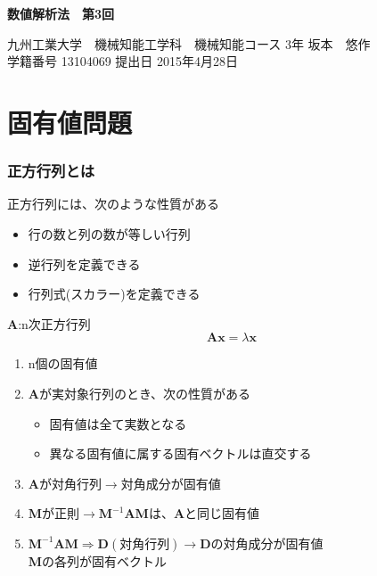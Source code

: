 \documentclass[a4j,twoside,openright,11pt]{jsarticle}
\begin{document}
\begin{screen}
\huge
\begin{center}
{\bf 数値解析法　第3回}\\
\end{center}

\normalsize
\begin{flushright}
九州工業大学　機械知能工学科　機械知能コース 3年 坂本　悠作\\学籍番号 13104069 \hspace{0.2in}提出日 2015年4月28日
\end{flushright}
\end{screen}


\setcounter{section}{2}
\section{固有値問題}
\subsubsection{正方行列とは}
正方行列には、次のような性質がある
\begin{itemize}
\item 行の数と列の数が等しい行列
\item 逆行列を定義できる
\item 行列式(スカラー)を定義できる
\end{itemize}

$\bm{A}$:n次正方行列
\begin{equation}
\bm{A}\bm{x}=\lambda\bm{x}
\end{equation}

\begin{enumerate}
\item n個の固有値
\item $\bm{A}$が実対象行列のとき、次の性質がある
\begin{itemize}
\item 固有値は全て実数となる
\item 異なる固有値に属する固有ベクトルは直交する
\end{itemize}
\item $\bm{A}$が対角行列$\rightarrow$対角成分が固有値
\item $\bm{M}$が正則$\rightarrow \bm{M}^{-1}\bm{A}\bm{M}$は、$\bm{A}$と同じ固有値
\item $\bm{M}^{-1}\bm{A}\bm{M} \Rightarrow \bm{D}(対角行列) \rightarrow \bm{D}の対角成分が固有値$\\
$\bm{M}$の各列が固有ベクトル
\end{enumerate}
\end{document}
